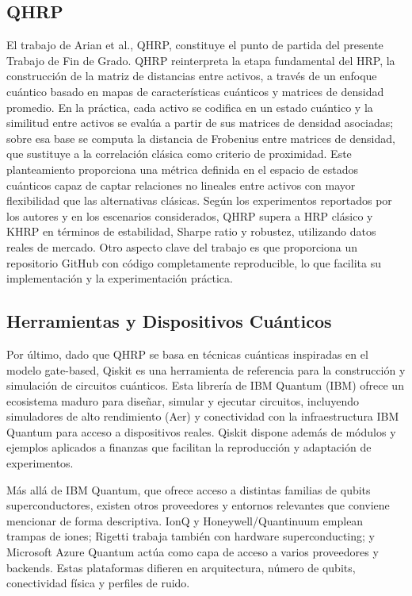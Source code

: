 \subsection{QHRP}
\label{subsec:qhrp}
El trabajo de Arian et al.\cite{arian2025qhrp}, \gls{QHRP}, constituye el punto de partida del presente Trabajo de Fin de Grado. \gls{QHRP}
reinterpreta la etapa fundamental del \gls{HRP}, la construcción de la matriz de distancias entre
activos, a través de un enfoque cuántico basado en mapas de características cuánticos y matrices de densidad
promedio. En la práctica, cada activo se codifica en un estado cuántico y la similitud entre activos
se evalúa a partir de sus matrices de densidad asociadas; sobre esa base se computa la distancia de Frobenius entre matrices de densidad, que sustituye a la correlación clásica como criterio de proximidad. Este planteamiento proporciona una métrica definida en el espacio
de estados cuánticos capaz de captar relaciones no lineales entre activos con mayor flexibilidad que
las alternativas clásicas. Según los experimentos reportados por los autores y en los escenarios
considerados, \gls{QHRP} supera a \gls{HRP} clásico y \gls{KHRP} en términos de estabilidad, Sharpe ratio y robustez,
utilizando datos reales de mercado. Otro aspecto clave del trabajo es que proporciona un repositorio
GitHub con código completamente reproducible, lo que facilita su implementación y la experimentación
práctica.

\subsection{Herramientas y Dispositivos Cuánticos}
\label{subsec:herramientas_y_dispositivos_cuanticos}
Por último, dado que \gls{QHRP} se basa en técnicas cuánticas inspiradas en el modelo gate-based, Qiskit es una herramienta de referencia para la construcción y simulación de circuitos cuánticos. Esta librería de IBM Quantum (IBM) ofrece un ecosistema maduro para diseñar, simular y ejecutar circuitos, incluyendo simuladores de alto rendimiento (Aer) y conectividad con la infraestructura IBM Quantum para acceso a dispositivos reales. Qiskit dispone además de módulos y ejemplos aplicados a finanzas que facilitan la reproducción y adaptación de experimentos.

Más allá de IBM Quantum, que ofrece acceso a distintas familias de qubits superconductores, existen otros proveedores y entornos relevantes que conviene mencionar de forma descriptiva. IonQ y Honeywell/Quantinuum emplean trampas de iones; Rigetti trabaja también con hardware superconducting; y Microsoft Azure Quantum actúa como capa de acceso a varios proveedores y backends. Estas plataformas difieren en arquitectura, número de qubits, conectividad física y perfiles de ruido.

